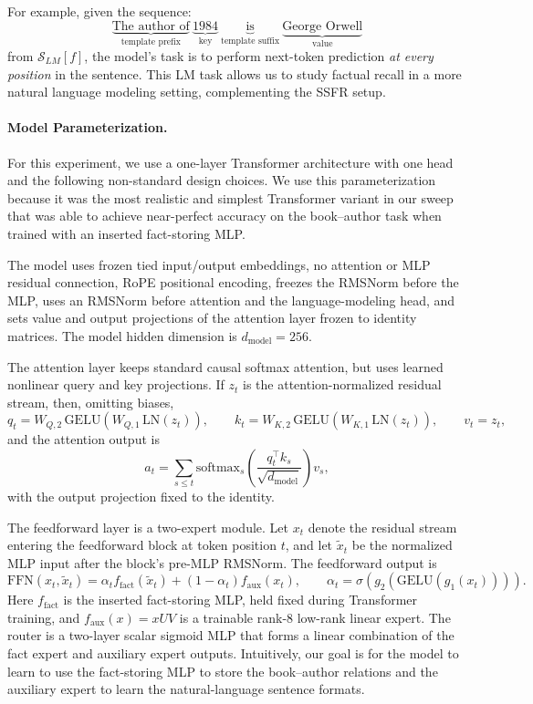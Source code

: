 For example, given the sequence:
\[
\underbrace{\text{The author of}}_{\text{template prefix}}\ 
\underbrace{1984}_{\text{key}}\ 
\underbrace{\text{is}}_{\text{template suffix}}\ 
\underbrace{\text{George Orwell}}_{\text{value}}
\]
from \(\mathcal{S}_{LM}[f]\), the model’s task is to perform next-token prediction \textit{at every position} in the sentence. This LM task allows us to study factual recall in a more natural language modeling setting, complementing the SSFR setup.

\paragraph{Model Parameterization.}
For this experiment, we use a one-layer Transformer architecture with one head and the following non-standard design choices.
We use this parameterization because it was the most
realistic and simplest Transformer variant in our sweep that was able to achieve near-perfect accuracy on the book--author task when trained with an inserted fact-storing MLP.

The model uses frozen tied input/output embeddings, no attention or
MLP residual connection, RoPE positional encoding, freezes the RMSNorm before the MLP, uses an RMSNorm before attention and the language-modeling head, and sets value and output projections of the attention layer frozen to identity matrices. The model hidden dimension is \(d_{\mathrm{model}}=256\).

The attention layer keeps standard causal softmax attention, but uses learned nonlinear query and key projections. If \(z_t\) is the attention-normalized residual stream, then, omitting biases,
\[
  q_t = W_{Q,2}\,\mathrm{GELU}(W_{Q,1}\,\mathrm{LN}(z_t)),
  \qquad
  k_t = W_{K,2}\,\mathrm{GELU}(W_{K,1}\,\mathrm{LN}(z_t)),
  \qquad
  v_t = z_t,
\]
and the attention output is
\[
  a_t=\sum_{s\le t}
  \mathrm{softmax}_{s}\!\left(\frac{q_t^\top k_s}{\sqrt{d_{\mathrm{model}}}}\right)
  v_s,
\]
with the output projection fixed to the identity.

The feedforward layer is a two-expert module. Let \(x_t\) denote the residual stream entering the feedforward block at token position \(t\), and let \(\tilde{x}_t\) be the normalized MLP input after the block's pre-MLP RMSNorm.
The feedforward output is
\[
  \mathrm{FFN}(x_t,\tilde{x}_t)
  =
  \alpha_t f_{\mathrm{fact}}(\tilde{x}_t)
  +
  (1-\alpha_t) f_{\mathrm{aux}}(x_t),
  \qquad
  \alpha_t=\sigma(g_2(\mathrm{GELU}(g_1(x_t)))).
\]
Here \(f_{\mathrm{fact}}\) is the inserted fact-storing MLP, held fixed during Transformer training, and \(f_{\mathrm{aux}}(x)=xUV\) is a trainable rank-\(8\) low-rank linear expert. The router is a two-layer scalar sigmoid MLP that forms a linear combination of the fact expert and auxiliary expert outputs. Intuitively, our goal is for the model to learn to use the fact-storing MLP to store the book--author relations and the auxiliary expert to learn the natural-language sentence formats.


